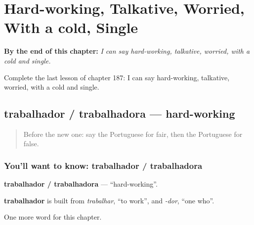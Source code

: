 
\chapter{Hard-working, Talkative, Worried, With a cold, Single}
\label{ch:pt-hard-working-talkative-worried-with-a-cold-single}

\begin{chapteropening}
\textbf{By the end of this chapter:} \emph{I can say hard-working, talkative, worried, with a cold and single.}

Complete the last lesson of chapter 187: I can say hard-working, talkative, worried, with a cold and single.
\end{chapteropening}

\section[trabalhador / trabalhadora]{trabalhador / trabalhadora — hard-working}

\label{lesson:PT-C187-trabalhador-trabalhadora}



\begin{quote}
Before the new one: say the Portuguese for fair, then the Portuguese for false.
\end{quote}

\subsection*{You'll want to know: trabalhador / trabalhadora}
\textbf{trabalhador / trabalhadora} — \textquotedblleft{}hard-working\textquotedblright{}.

\begin{cousinweb}
\textbf{trabalhador} is built from \emph{trabalhar}, \textquotedblleft{}to work\textquotedblright{}, and \emph{-dor}, \textquotedblleft{}one who\textquotedblright{}.
\end{cousinweb}

\begin{grammarlens}[title={What you've built}]
One more word for this chapter.
\end{grammarlens}

